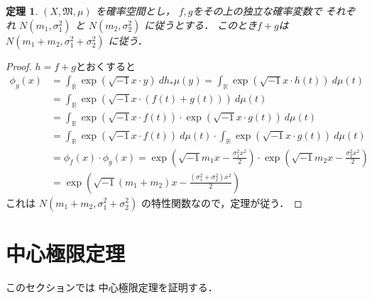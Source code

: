 \documentclass[leqno, 12pt]{jsarticle}
\newtheorem{thm}{定理}
\newcommand{\rr}{\mathbb{R}}
\begin{document}
\begin{thm}
$(X, \mathfrak{M}, \mu)$
を確率空間とし，
$f, g$をその上の独立な確率変数で
それぞれ
$N(m_{1}, \sigma_{1}^2)$
と
$N(m_{2}, \sigma_{2}^2)$
に従うとする．
このとき$f+g$は
$N(m_{1}+m_{2}, \sigma_{1}^2+\sigma_{2}^{2})$
に従う．
\end{thm}
\begin{proof}
$h=f+g$とおくすると
\begin{align*}
\phi_{g}(x)
&=
\int_{\rr}
	\exp(\sqrt{-1}x\cdot y)\ 
	dh_{*}\mu (y)
	=
	\int_{\rr}
	\exp(\sqrt{-1}x\cdot h(t))\ 
	d\mu (t)\\
	&=
	\int_{\rr}
	\exp(\sqrt{-1}x\cdot (f(t)+g(t)))\ 
	d\mu (t)\\
	&=
	\int_{\rr}
	\exp(\sqrt{-1}x\cdot f(t))\cdot 
	\exp(\sqrt{-1}x\cdot g(t))\ 
	d\mu (t)\\
	&=
	\int_{\rr}
	\exp(\sqrt{-1}x\cdot f(t))\ d\mu(t)\cdot 
	\int_{\rr}
	\exp(\sqrt{-1}x\cdot g(t))\ 
	d\mu (t)\\
	&=
	\phi_{f}(x)\cdot \phi_{g}(x)
	=
	\exp\left(\sqrt{-1}m_{1}x-\frac{\sigma_{1}^2x^2}{2}\right)
	\cdot 
	\exp\left(\sqrt{-1}m_{2}x-\frac{\sigma_{2}^2x^2}{2}\right)
	\\
	&=
	\exp\left(\sqrt{-1}(m_{1}+m_{2})x-\frac{(\sigma_{1}^2+\sigma_{2}^2)x^2}{2}\right)
\end{align*}
これは
$N(m_{1}+m_{2}, \sigma_{1}^2+\sigma_{2}^{2})$
の特性関数なので，定理が従う．
\end{proof}




\section{中心極限定理}
このセクションでは
中心極限定理を証明する．
\end{document}
